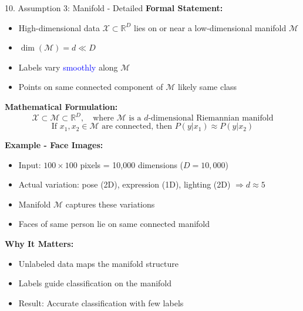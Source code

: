 \documentclass[8pt]{beamer}
\begin{document}
	\begin{frame}{10. Assumption 3: Manifold - Detailed}
		\fontsize{6.5}{7.5}\selectfont
		\textbf{Formal Statement:}
		\begin{itemize}
			\item High-dimensional data $\mathcal{X} \subset \mathbb{R}^D$ lies on or near a low-dimensional manifold $\mathcal{M}$
			\item $\dim(\mathcal{M}) = d \ll D$
			\item Labels vary \textcolor{blue}{smoothly} along $\mathcal{M}$
			\item Points on same connected component of $\mathcal{M}$ likely same class
		\end{itemize}
		
		\textbf{Mathematical Formulation:}
		\[
		\mathcal{X} \subset \mathcal{M} \subset \mathbb{R}^D, \quad \text{where } \mathcal{M} \text{ is a } d\text{-dimensional Riemannian manifold}
		\]
		\[
		\text{If } x_1, x_2 \in \mathcal{M} \text{ are connected, then } P(y|x_1) \approx P(y|x_2)
		\]
		
		\textbf{Example - Face Images:}
		\begin{itemize}
			\item Input: $100 \times 100$ pixels = 10,000 dimensions ($D = 10,000$)
			\item Actual variation: pose (2D), expression (1D), lighting (2D) $\Rightarrow d \approx 5$
			\item Manifold $\mathcal{M}$ captures these variations
			\item Faces of same person lie on same connected manifold
		\end{itemize}
		
		\textbf{Why It Matters:}
		\begin{itemize}
			\item Unlabeled data maps the manifold structure
			\item Labels guide classification on the manifold
			\item Result: Accurate classification with few labels
		\end{itemize}
	\end{frame}
	
\end{document}
